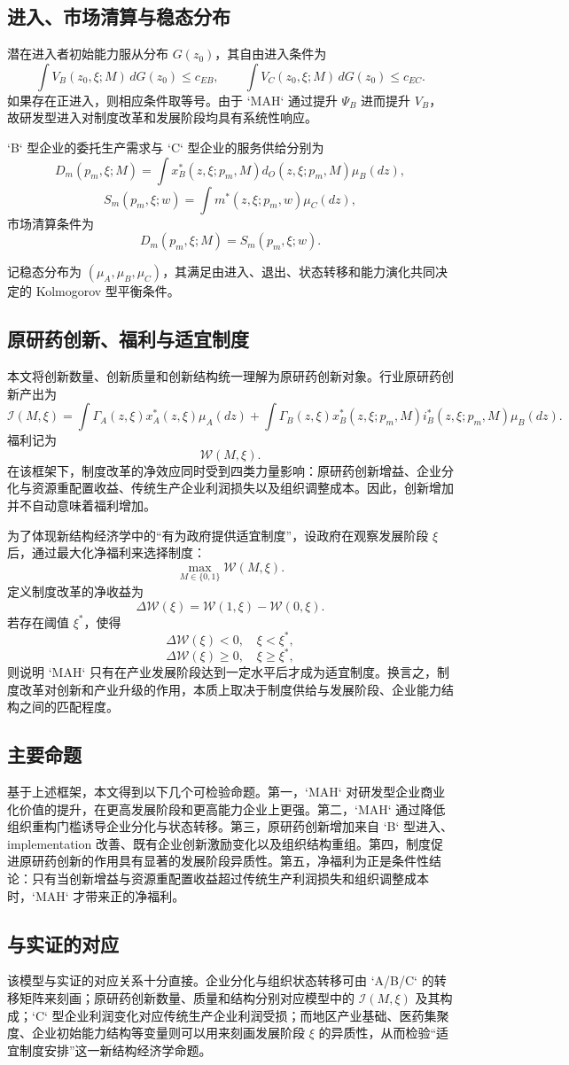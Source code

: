 \subsection{进入、市场清算与稳态分布}

潜在进入者初始能力服从分布 $G(z_0)$，其自由进入条件为
\[
\int V_B(z_0,\xi;M)\,dG(z_0)\le c_{EB},
\qquad
\int V_C(z_0,\xi;M)\,dG(z_0)\le c_{EC}.
\]
如果存在正进入，则相应条件取等号。由于 `MAH` 通过提升 $\Psi_B$ 进而提升 $V_B$，故研发型进入对制度改革和发展阶段均具有系统性响应。

`B` 型企业的委托生产需求与 `C` 型企业的服务供给分别为
\[
D_m(p_m,\xi;M)
=
\int x_B^*(z,\xi;p_m,M)d_O(z,\xi;p_m,M)\mu_B(dz),
\]
\[
S_m(p_m,\xi;w)
=
\int m^*(z,\xi;p_m,w)\mu_C(dz),
\]
市场清算条件为
\[
D_m(p_m,\xi;M)=S_m(p_m,\xi;w).
\]

记稳态分布为 $(\mu_A,\mu_B,\mu_C)$，其满足由进入、退出、状态转移和能力演化共同决定的 Kolmogorov 型平衡条件。

\subsection{原研药创新、福利与适宜制度}

本文将创新数量、创新质量和创新结构统一理解为原研药创新对象。行业原研药创新产出为
\[
\mathcal{I}(M,\xi)
=
\int \Gamma_A(z,\xi)x_A^*(z,\xi)\mu_A(dz)
+\int \Gamma_B(z,\xi)x_B^*(z,\xi;p_m,M)i_B^*(z,\xi;p_m,M)\mu_B(dz).
\]
福利记为
\[
\mathcal{W}(M,\xi).
\]
在该框架下，制度改革的净效应同时受到四类力量影响：原研药创新增益、企业分化与资源重配置收益、传统生产企业利润损失以及组织调整成本。因此，创新增加并不自动意味着福利增加。

为了体现新结构经济学中的“有为政府提供适宜制度”，设政府在观察发展阶段 $\xi$ 后，通过最大化净福利来选择制度：
\[
\max_{M \in \{0,1\}} \mathcal{W}(M,\xi).
\]
定义制度改革的净收益为
\[
\Delta \mathcal{W}(\xi)=\mathcal{W}(1,\xi)-\mathcal{W}(0,\xi).
\]
若存在阈值 $\xi^*$，使得
\[
\Delta \mathcal{W}(\xi)<0,\quad \xi<\xi^*,
\]
\[
\Delta \mathcal{W}(\xi)\ge 0,\quad \xi\ge \xi^*,
\]
则说明 `MAH` 只有在产业发展阶段达到一定水平后才成为适宜制度。换言之，制度改革对创新和产业升级的作用，本质上取决于制度供给与发展阶段、企业能力结构之间的匹配程度。

\subsection{主要命题}

基于上述框架，本文得到以下几个可检验命题。第一，`MAH` 对研发型企业商业化价值的提升，在更高发展阶段和更高能力企业上更强。第二，`MAH` 通过降低组织重构门槛诱导企业分化与状态转移。第三，原研药创新增加来自 `B` 型进入、implementation 改善、既有企业创新激励变化以及组织结构重组。第四，制度促进原研药创新的作用具有显著的发展阶段异质性。第五，净福利为正是条件性结论：只有当创新增益与资源重配置收益超过传统生产利润损失和组织调整成本时，`MAH` 才带来正的净福利。

\subsection{与实证的对应}

该模型与实证的对应关系十分直接。企业分化与组织状态转移可由 `A/B/C` 的转移矩阵来刻画；原研药创新数量、质量和结构分别对应模型中的 $\mathcal{I}(M,\xi)$ 及其构成；`C` 型企业利润变化对应传统生产企业利润受损；而地区产业基础、医药集聚度、企业初始能力结构等变量则可以用来刻画发展阶段 $\xi$ 的异质性，从而检验“适宜制度安排”这一新结构经济学命题。
